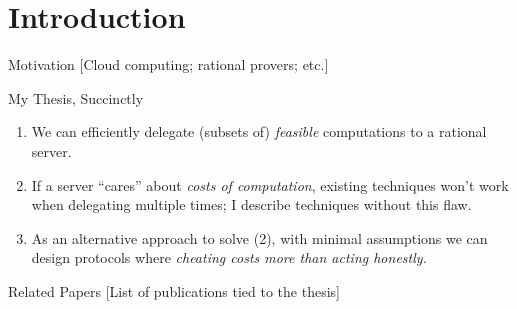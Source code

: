 \section{Introduction}

\begin{frame}{Motivation}
[Cloud computing; rational provers; etc.]
\end{frame}


\begin{frame}{My Thesis, Succinctly}
	\begin{enumerate}
		\item We can efficiently delegate (subsets of) \textit{feasible} computations to a rational server.\pause
		\item If a server ``cares'' about \textit{costs of computation}, existing techniques won't work when delegating multiple times; \pause I describe techniques without this flaw.\pause
		\item As an alternative approach to solve (2), with minimal assumptions we can design protocols where \textit{cheating costs more than acting honestly.}
	\end{enumerate}
\end{frame}

\begin{frame}{Related Papers}
	[List of publications tied to the thesis]
\end{frame}


